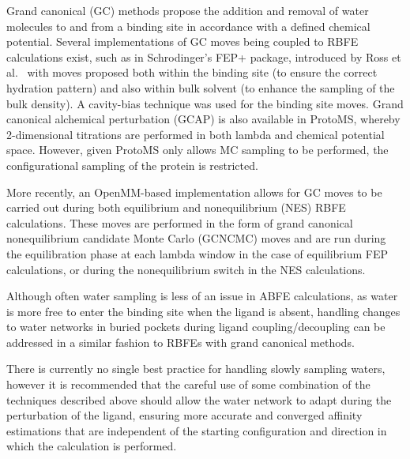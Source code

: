 \documentclass[9pt,bestpractices]{livecoms}
\begin{document}
Grand canonical (GC) methods propose the addition and removal of water molecules to and from a binding site in accordance with a defined chemical potential. Several implementations of GC moves being coupled to RBFE calculations exist, such as in Schrodinger's FEP+ package, introduced by Ross et al.~\cite{ross2020enhancing} with moves proposed both within the binding site (to ensure the correct hydration pattern) and also within bulk solvent (to enhance the sampling of the bulk density). A cavity-bias technique was used for the binding site moves. Grand canonical alchemical perturbation (GCAP)\cite{brucemacdonald2018ligand} is also available in ProtoMS\cite{woods2018protoms}, whereby 2-dimensional titrations are performed in both lambda and chemical potential space. However, given ProtoMS only allows MC sampling to be performed, the configurational sampling of the protein is restricted.

More recently, an OpenMM-based implementation allows for GC moves to be carried out during both equilibrium and nonequilibrium (NES) RBFE calculations\cite{melling2025developing}. These moves are performed in the form of grand canonical nonequilibrium candidate Monte Carlo (GCNCMC) moves\cite{melling2023enhanced} and are run during the equilibration phase at each lambda window in the case of equilibrium FEP calculations, or during the nonequilibrium switch in the NES calculations.

Although often water sampling is less of an issue in ABFE calculations, as water is more free to enter the binding site when the ligand is absent, handling changes to water networks in buried pockets during ligand coupling/decoupling can be addressed in a similar fashion to RBFEs with grand canonical methods.


There is currently no single best practice for handling slowly sampling waters, however it is recommended that the careful use of some combination of the techniques described above should allow the water network to adapt during the perturbation of the ligand, ensuring more accurate and converged affinity estimations that are independent of the starting configuration and direction in which the calculation is performed.
\end{document}
